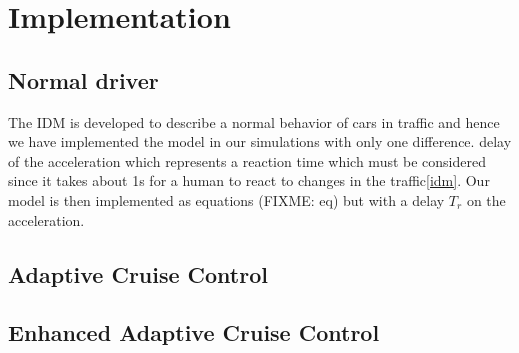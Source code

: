 \section{Implementation}
\subsection{Normal driver}
The IDM is developed to describe a normal behavior of cars in traffic and hence we have implemented the model in our simulations with only one difference. delay of the acceleration which represents a reaction time which must be considered since it takes about 1s for a human to react to changes in the traffic\ref{idm}. Our model is then implemented as equations (FIXME: eq) but with a delay \begin{math}T_r\end{math} on the acceleration.

\subsection{Adaptive Cruise Control}

\subsection{Enhanced Adaptive Cruise Control}
